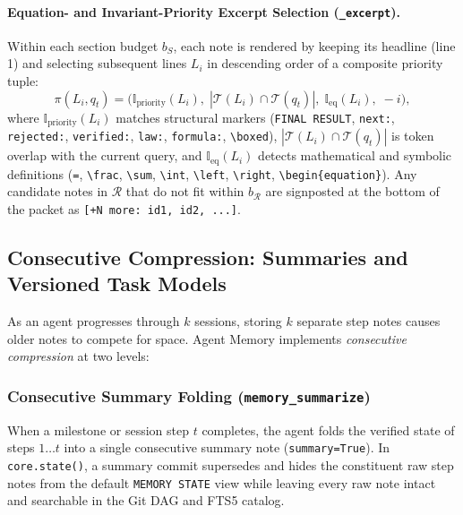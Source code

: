 \documentclass[11pt,a4paper]{article}
\begin{document}
\paragraph{Equation- and Invariant-Priority Excerpt Selection (\texttt{\_excerpt}).}
Within each section budget $b_S$, each note is rendered by keeping its headline (line 1) and selecting subsequent lines $L_i$ in descending order of a composite priority tuple:
\begin{equation}
    \pi(L_i, q_t) = \Big( \mathbb{I}_{\text{priority}}(L_i),\; |\mathcal{T}(L_i) \cap \mathcal{T}(q_t)|,\; \mathbb{I}_{\text{eq}}(L_i),\; -i \Big),
\end{equation}
where $\mathbb{I}_{\text{priority}}(L_i)$ matches structural markers (\texttt{FINAL RESULT}, \texttt{next:}, \texttt{rejected:}, \texttt{verified:}, \texttt{law:}, \texttt{formula:}, \texttt{\textbackslash boxed}), $|\mathcal{T}(L_i) \cap \mathcal{T}(q_t)|$ is token overlap with the current query, and $\mathbb{I}_{\text{eq}}(L_i)$ detects mathematical and symbolic definitions (\texttt{=}, \texttt{\textbackslash frac}, \texttt{\textbackslash sum}, \texttt{\textbackslash int}, \texttt{\textbackslash left}, \texttt{\textbackslash right}, \texttt{\textbackslash begin\{equation\}}). Any candidate notes in $\mathcal{R}$ that do not fit within $b_{\mathcal{R}}$ are signposted at the bottom of the packet as \texttt{[+N more: id1, id2, ...]}.

\subsection{Consecutive Compression: Summaries and Versioned Task Models}

As an agent progresses through $k$ sessions, storing $k$ separate step notes causes older notes to compete for space. Agent Memory implements \emph{consecutive compression} at two levels:

\subsubsection{Consecutive Summary Folding (\texttt{memory\_summarize})}
When a milestone or session step $t$ completes, the agent folds the verified state of steps $1\dots t$ into a single consecutive summary note (\texttt{summary=True}). In \texttt{core.state()}, a summary commit supersedes and hides the constituent raw step notes from the default \texttt{MEMORY STATE} view while leaving every raw note intact and searchable in the Git DAG and FTS5 catalog.
\end{document}
